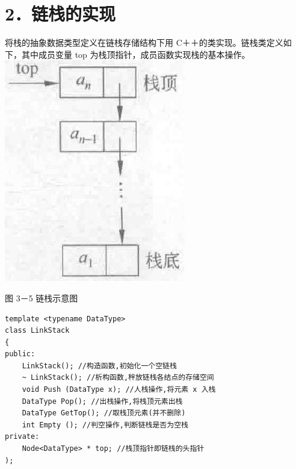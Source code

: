 \documentclass[10pt]{article}
\begin{document}
\section*{2．链栈的实现}
将栈的抽象数据类型定义在链栈存储结构下用 C＋＋的类实现。链栈类定义如下，其中成员变量 top 为栈顶指针，成员函数实现栈的基本操作。\\
\includegraphics[max width=\textwidth, center]{2025_06_06_704745ea57b15b2333e5g-088}

图 3－5 链栈示意图

\begin{verbatim}
template <typename DataType>
class LinkStack
{
public:
    LinkStack(); //构造函数,初始化一个空链栈
    ~ LinkStack(); //析构函数,秚放链栈各结点的存储空间
    void Push (DataType x); //人栈操作,将元素 x 入栈
    DataType Pop(); //出栈操作,将栈顶元素出栈
    DataType GetTop(); //取栈顶元素(并不删除)
    int Empty (); //判空操作,判断链栈是否为空栈
private:
    Node<DataType> * top; //栈顶指针即链栈的头指针
);
\end{verbatim}
\end{document}
